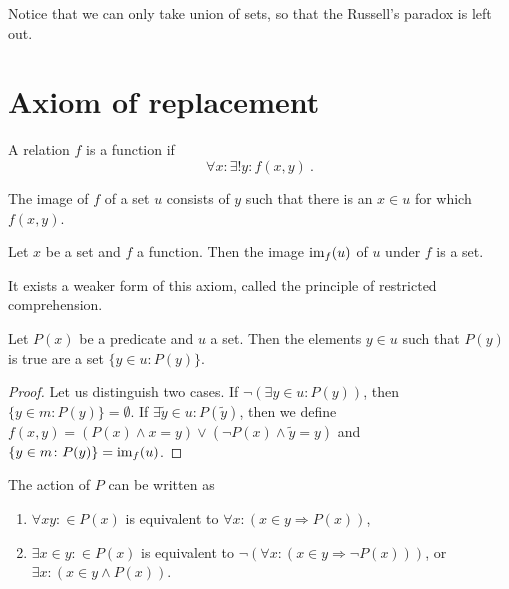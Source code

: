     Notice that we can only take union of sets, so that the Russell's paradox is left out.

\section{Axiom of replacement}

    \begin{definition}
        A relation $f$ is a function if 
        \begin{equation*}
            \forall x \colon \exists! y \colon f(x,y) ~.
        \end{equation*}
    \end{definition}

    \begin{definition}
        The image of $f$ of a set $u$ consists of $y$ such that there is an $x \in u$ for which $f(x,y)$.
    \end{definition}

    \begin{axiom}[Replacement]
        Let $x$ be a set and $f$ a function. Then the image $\operatorname{im}_f (u)$ of $u$ under $f$ is a set.
    \end{axiom}

    It exists a weaker form of this axiom, called the principle of restricted comprehension. 
    \begin{theorem}
        Let $P(x)$ be a predicate and $u$ a set. Then the elements $y \in u$ such that $P(y)$ is true are a set $\{y \in u \colon P(y)\}$.
    \end{theorem}
    \begin{proof}
        Let us distinguish two cases. If $\lnot (\exists y \in u \colon P(y))$, then $\{y \in m \colon P(y)\} = \emptyset$. If $\exists \tilde y \in u \colon P(\tilde y)$, then we define $f(x,y) = (P(x) \land x = y) \lor (\lnot P(x) \land \tilde y = y )$ and $\{y \in m \colon P(y)\} = \operatorname{im}_f(u)$.
    \end{proof}
    The action of $P$ can be written as 
    \begin{enumerate}
        \item $\forall x y \colon \in P(x)$ is equivalent to $\forall x \colon (x \in y \Rightarrow P(x))$,  
        \item $\exists x \in y \colon \in P(x)$ is equivalent to $\lnot (\forall x \colon (x \in y \Rightarrow \lnot P(x)))$, or $\exists x \colon (x \in y \land P(x))$.
    \end{enumerate}

